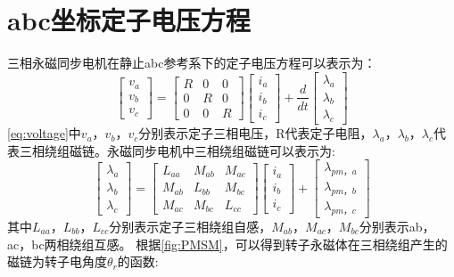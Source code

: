 \section{abc坐标定子电压方程}
三相永磁同步电机在静止abc参考系下的定子电压方程可以表示为：
\begin{equation}\label{eq:voltage}
\begin{bmatrix}v_{a}\\v_{b}\\v_{c} \end{bmatrix}
=
\begin{bmatrix}R&0&0\\0&R&0\\0&0&R\end{bmatrix}
\begin{bmatrix} i_{a}\\i_{b}\\i_{c}\end{bmatrix}
+
\frac d{dt} \begin{bmatrix}\lambda_{a}\\\lambda_{b}\\\lambda_{c}\end{bmatrix}
\end{equation} 
\ref{eq:voltage}中$v_{a}，v_{b}，v_{c}$分别表示定子三相电压，R代表定子电阻，$\lambda_{a}，\lambda_{b}，\lambda_{c}$代表三相绕组磁链。永磁同步电机中三相绕组磁链可以表示为:
\begin{equation}
\begin{bmatrix}\label{eq:flux}
\lambda_{a}\\\lambda_{b}\\\lambda_{c}\end{bmatrix}=\begin{bmatrix}
L_{aa}&M_{ab}&M_{ac}\\M_{ab}&L_{bb}&M_{bc}\\M_{ac}&M_{bc}&L_{cc}
\end{bmatrix}
\begin{bmatrix}
i_{a}\\i_{b}\\i_{c}
\end{bmatrix}
+\begin{bmatrix}\lambda_{pm，a}\\\lambda_{pm，b}\\\lambda_{pm，c}\end{bmatrix}
\end{equation}
其中$L_{aa}$，$L_{bb}$，$L_{cc}$分别表示定子三相绕组自感，$M_{ab}$，$M_{ac}$，$M_{bc}$分别表示ab，ac，bc两相绕组互感。
根据\ref{fig:PMSM}，可以得到转子永磁体在三相绕组产生的磁链为转子电角度$\theta_{r}$的函数:
